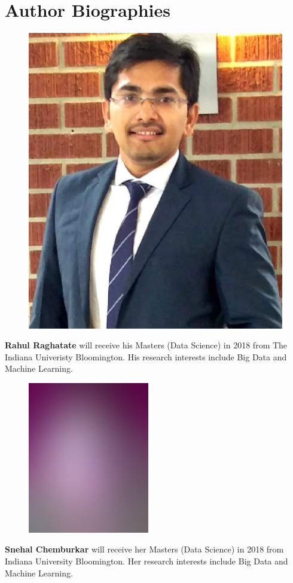 \documentclass[9pt,twocolumn,twoside]{../../styles/osajnl}
\begin{document}


\section*{Author Biographies}
\begingroup \setlength\intextsep{0pt}
\begin{minipage}[t][3.2cm][t]{1.0\columnwidth}
  \begin{figure}
    \includegraphics[width=0.25\columnwidth]{images/rahul_thumbnail.jpg}
  \end{figure}
  \noindent
  {\bfseries Rahul Raghatate} will receive his Masters (Data Science)
  in 2018 from The Indiana Univeristy Bloomington. His research
  interests include Big Data and Machine Learning.
\end{minipage}
\begin{minipage}[t][3.2cm][t]{1.0\columnwidth} %
  \begin{figure}
    \includegraphics[width=0.25\columnwidth]{images/alice_smith.eps}
  \end{figure}
  \noindent
  {\bfseries Snehal Chemburkar} will receive her Masters (Data
  Science) in 2018 from Indiana University Bloomington. Her research
  interests include Big Data and Machine Learning.
\end{minipage}
\endgroup

\appendix
\end{document}
